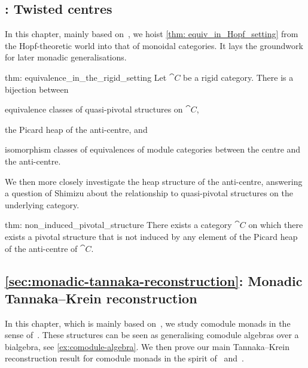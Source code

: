 \subsection*{: Twisted centres}

In this chapter, mainly based on~\cite{halbig24:pivot-hopf},
we hoist \cref{thm: equiv_in_Hopf_setting}
from the Hopf-theoretic world
into that of monoidal categories.
It lays the groundwork for later monadic generalisations.

\begin{reptheorem}{thm: equivalence_in_the_rigid_setting}
  Let \(\cat{C}\) be a rigid category.
  There is a bijection between
  \begin{thmlist}[noitemsep]
    \item equivalence classes of quasi-pivotal structures on \(\cat{C}\),
    \item the Picard heap of the anti\hyp{}centre, and
    \item isomorphism classes of equivalences of module categories between the centre and the anti\hyp{}centre.
  \end{thmlist}
\end{reptheorem}

We then more closely investigate the heap structure of the anti-centre,
answering a question of Shimizu about the relationship to quasi-pivotal structures on the underlying category.

\begin{reptheorem}{thm: non_induced_pivotal_structure}
  There exists a category \(\cat{C}\)
  on which there exists a pivotal structure
  that is not induced by any element of the Picard heap of the anti\hyp{}centre of \(\cat{C}\).
\end{reptheorem}

\subsection*{\cref{sec:monadic-tannaka-reconstruction}: Monadic Tannaka--Krein reconstruction}

In this chapter,
which is mainly based on~\cite{halbig23:diagr-comod-monad,halbig24:pivot-hopf,stroinski2024:reconstr},
we study comodule monads in the sense of~\cite{Aguiar2012}.
These structures can be seen as generalising comodule algebras over a bialgebra, see \cref{ex:comodule-algebra}.
We then prove our main Tannaka--Krein reconstruction result for comodule monads
in the spirit of~\cite[Theorem~7.1]{Moerdijk2002} and~\cite[Corollary~3.13]{McCrudden2002}.

